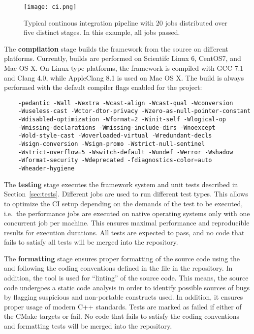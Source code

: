 \begin{figure}[btp]
  \centering
  \texttt{[image: ci.png]}
  \caption{Typical \apsq continous integration pipeline with 20 jobs distributed over five distinct stages. In this example, all jobs passed.}
  \label{fig:ci}
\end{figure}

The \textbf{compilation} stage builds the framework from the source on different platforms.
Currently, builds are performed on Scientifc Linux 6, CentOS7, and Mac OS X.
On Linux type platforms, the framework is compiled with GCC 7.1 and Clang 4.0, while AppleClang 8.1 is used on Mac OS X.
The build is always performed with the default compiler flags enabled for the project:
\begin{verbatim}
    -pedantic -Wall -Wextra -Wcast-align -Wcast-qual -Wconversion
    -Wuseless-cast -Wctor-dtor-privacy -Wzero-as-null-pointer-constant
    -Wdisabled-optimization -Wformat=2 -Winit-self -Wlogical-op
    -Wmissing-declarations -Wmissing-include-dirs -Wnoexcept
    -Wold-style-cast -Woverloaded-virtual -Wredundant-decls
    -Wsign-conversion -Wsign-promo -Wstrict-null-sentinel
    -Wstrict-overflow=5 -Wswitch-default -Wundef -Werror -Wshadow
    -Wformat-security -Wdeprecated -fdiagnostics-color=auto
    -Wheader-hygiene
\end{verbatim}

The \textbf{testing} stage executes the framework system and unit tests described in Section~\ref{sec:tests}.
Different jobs are used to run different test types.
This allows to optimize the CI setup depending on the demands of the test to be executed, i.e.\ the performance jobs are executed on native operating systems only with one concurrent job per machine.
This ensures maximal performance and reproducible results for execution durations.
All tests are expected to pass, and no code that fails to satisfy all tests will be merged into the repository.

The \textbf{formatting} stage ensures proper formatting of the source code using the  and following the coding conventions defined in the  file in the repository.
In addition, the  tool is used for ``linting'' of the source code.
This means, the source code undergoes a static code analysis in order to identify possible sources of bugs by flagging suspicious and non-portable constructs used.
In addition, it ensures proper usage of modern C++ standards.
Tests are marked as failed if either of the CMake targets  or  fail.
No code that fails to satisfy the coding conventions and formatting tests will be merged into the repository.

